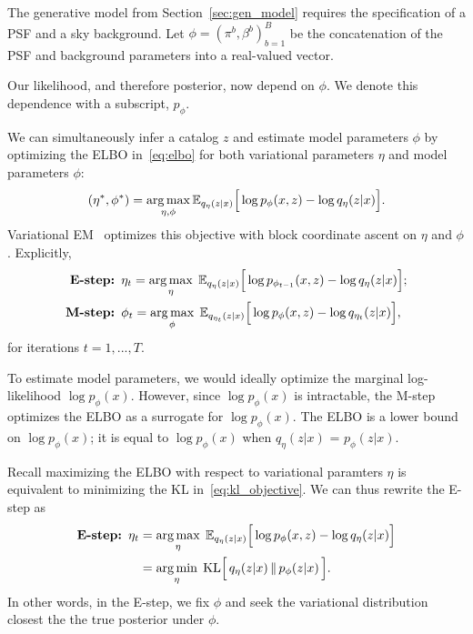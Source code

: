 The generative model from Section~\ref{sec:gen_model} requires
the specification of a PSF and a sky background. Let $\phi = (\pi^b, \beta^b)_{b = 1}^B$ be the concatenation of the PSF and background parameters into a real-valued vector. 

Our likelihood, and therefore posterior, now depend on $\phi$. We denote this dependence with a subscript, $p_\phi$. 

We can simultaneously infer a catalog $z$ and 
estimate model parameters $\phi$ by optimizing 
the ELBO in~\eqref{eq:elbo} for both variational parameters $\eta$ and model parameters $\phi$: 
\begin{align}
(\eta^*, \phi^*) = \operatorname*{arg\,max}_{\eta, \phi} \mathbb{E}_{q_\eta(z | x)}\Big[\log p_\phi(x, z) - \log q_\eta(z | x)\Big].
\label{eq:em_obj}
\end{align}
Variational EM~\cite{Jordan_intro_vi, neal2000varem, Beal2002varem} optimizes this objective with block coordinate ascent on $\eta$ and $\phi$. Explicitly, 
\begin{align}
    \text{{\bf E-step: }} & 
    \eta_{t} = \operatorname*{arg\,max}_{\eta}\; \mathbb{E}_{q_\eta(z | x)}\Big[\log p_{\phi_{t-1}}(x, z) - \log q_\eta(z | x)\Big]; 
    \label{eq:e_step}
    \\
    \text{{\bf M-step: }} & \phi_{t} = \operatorname*{arg\,max}_{\phi}\; \mathbb{E}_{q_{\eta_t}(z | x)}\Big[\log p_{\phi}(x, z) - \log q_{\eta_t}(z | x)\Big],
    \label{eq:m_step}
\end{align}
for iterations $t = 1, ..., T$. 

To estimate model parameters, we would ideally optimize the marginal log-likelihood $\log p_\phi(x)$. However, since $\log p_\phi(x)$ is intractable, the M-step optimizes the ELBO as a surrogate for $\log p_\phi(x)$. The ELBO is a lower bound on 
$\log p_\phi(x)$; it is equal to $\log p_\phi(x)$ when $q_\eta(z | x)$ 
= $p_\phi(z | x)$. 

Recall maximizing the ELBO with respect to variational paramters $\eta$ 
is equivalent to minimizing the KL in~\eqref{eq:kl_objective}.
We can thus rewrite the E-step as 
\begin{align}
    \text{{\bf E-step: }} \eta_{t} &= \operatorname*{arg\,max}_{\eta}\; \mathbb{E}_{q_\eta(z | x)}\Big[\log p_{\phi}(x, z) - \log q_\eta(z | x)\Big] \\
    &= \operatorname*{arg\,min}_{\eta} \; \mathrm{KL}\Big[\,q_\eta(z | x)\, \| \,p_\phi(z | x )\,\Big].  \label{eq:e_step_kl}
\end{align} 
In other words, in the E-step, we fix $\phi$ and seek the variational distribution closest the the true posterior under $\phi$. 


